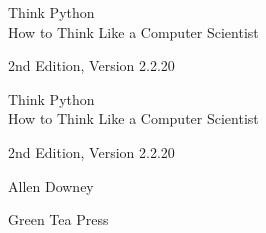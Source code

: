 \documentclass[10pt]{book}
\newcommand{\theversion}{2nd Edition, Version 2.2.20}
\newcommand{\thedate}{}
\begin{document}
\begin{latexonly}

\renewcommand{\blankpage}{\thispagestyle{empty} \quad \newpage}



\thispagestyle{empty}

\begin{flushright}
\vspace*{2.0in}

\begin{spacing}{3}
{\huge Think Python}\\
{\Large How to Think Like a Computer Scientist}
\end{spacing}

\vspace{0.25in}

\theversion

\thedate

\vfill

\end{flushright}


\blankpage
\blankpage

\pagebreak
\thispagestyle{empty}

\begin{flushright}
\vspace*{2.0in}

\begin{spacing}{3}
{\huge Think Python}\\
{\Large How to Think Like a Computer Scientist}
\end{spacing}

\vspace{0.25in}

\theversion

\thedate

\vspace{1in}


{\Large
Allen Downey\\
}


\vspace{0.5in}

{\Large Green Tea Press}


\end{flushright}
\end{latexonly}
\end{document}
